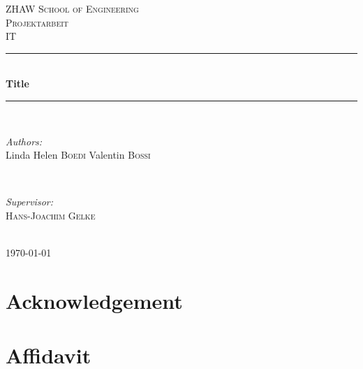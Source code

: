 \documentclass[12pt, a4paper]{report}
\begin{document}
\begin{titlepage}

\newcommand{\HRule}{\rule{\linewidth}{0.5mm}} %

\center %

\textsc{\LARGE ZHAW School of Engineering}\\[1.5cm] %
\textsc{\Large Projektarbeit}\\[0.5cm] %
\textsc{\large IT}\\[0.5cm] %

\HRule \\[0.4cm]
{ \huge \bfseries Title}\\[0.4cm] %
\HRule \\[1.5cm]


\begin{minipage}{0.4\textwidth}
\begin{flushleft} \large
\emph{Authors:}\\
Linda Helen \textsc{Boedi}  Valentin \textsc{Bossi} %
\end{flushleft}
\end{minipage}
~
\begin{minipage}{0.4\textwidth}
\begin{flushright} \large
\emph{Supervisor:} \\
 \textsc{Hans-Joachim Gelke} %
\end{flushright}
\end{minipage}\\[2cm]


{\large \today}\\[2cm] 


\vfill 

\end{titlepage}

\chapter{Acknowledgement}

\chapter{Affidavit}
\end{document}
